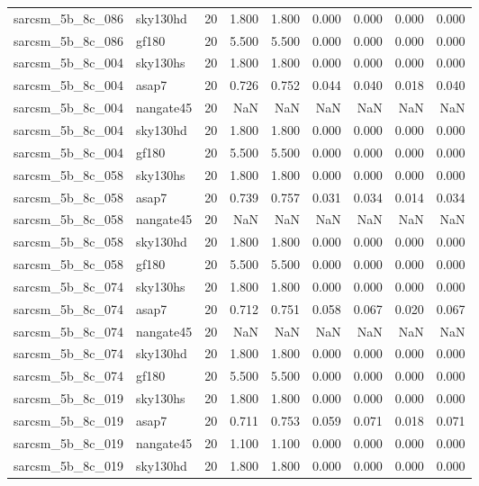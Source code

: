 \begin{tabular}{llrrrrrrr}
sarcsm\_5b\_8c\_086 & sky130hd & 20 & 1.800 & 1.800 & 0.000 & 0.000 & 0.000 & 0.000 \\
sarcsm\_5b\_8c\_086 & gf180 & 20 & 5.500 & 5.500 & 0.000 & 0.000 & 0.000 & 0.000 \\
sarcsm\_5b\_8c\_004 & sky130hs & 20 & 1.800 & 1.800 & 0.000 & 0.000 & 0.000 & 0.000 \\
sarcsm\_5b\_8c\_004 & asap7 & 20 & 0.726 & 0.752 & 0.044 & 0.040 & 0.018 & 0.040 \\
sarcsm\_5b\_8c\_004 & nangate45 & 20 & NaN & NaN & NaN & NaN & NaN & NaN \\
sarcsm\_5b\_8c\_004 & sky130hd & 20 & 1.800 & 1.800 & 0.000 & 0.000 & 0.000 & 0.000 \\
sarcsm\_5b\_8c\_004 & gf180 & 20 & 5.500 & 5.500 & 0.000 & 0.000 & 0.000 & 0.000 \\
sarcsm\_5b\_8c\_058 & sky130hs & 20 & 1.800 & 1.800 & 0.000 & 0.000 & 0.000 & 0.000 \\
sarcsm\_5b\_8c\_058 & asap7 & 20 & 0.739 & 0.757 & 0.031 & 0.034 & 0.014 & 0.034 \\
sarcsm\_5b\_8c\_058 & nangate45 & 20 & NaN & NaN & NaN & NaN & NaN & NaN \\
sarcsm\_5b\_8c\_058 & sky130hd & 20 & 1.800 & 1.800 & 0.000 & 0.000 & 0.000 & 0.000 \\
sarcsm\_5b\_8c\_058 & gf180 & 20 & 5.500 & 5.500 & 0.000 & 0.000 & 0.000 & 0.000 \\
sarcsm\_5b\_8c\_074 & sky130hs & 20 & 1.800 & 1.800 & 0.000 & 0.000 & 0.000 & 0.000 \\
sarcsm\_5b\_8c\_074 & asap7 & 20 & 0.712 & 0.751 & 0.058 & 0.067 & 0.020 & 0.067 \\
sarcsm\_5b\_8c\_074 & nangate45 & 20 & NaN & NaN & NaN & NaN & NaN & NaN \\
sarcsm\_5b\_8c\_074 & sky130hd & 20 & 1.800 & 1.800 & 0.000 & 0.000 & 0.000 & 0.000 \\
sarcsm\_5b\_8c\_074 & gf180 & 20 & 5.500 & 5.500 & 0.000 & 0.000 & 0.000 & 0.000 \\
sarcsm\_5b\_8c\_019 & sky130hs & 20 & 1.800 & 1.800 & 0.000 & 0.000 & 0.000 & 0.000 \\
sarcsm\_5b\_8c\_019 & asap7 & 20 & 0.711 & 0.753 & 0.059 & 0.071 & 0.018 & 0.071 \\
sarcsm\_5b\_8c\_019 & nangate45 & 20 & 1.100 & 1.100 & 0.000 & 0.000 & 0.000 & 0.000 \\
sarcsm\_5b\_8c\_019 & sky130hd & 20 & 1.800 & 1.800 & 0.000 & 0.000 & 0.000 & 0.000 \\

\end{tabular}
